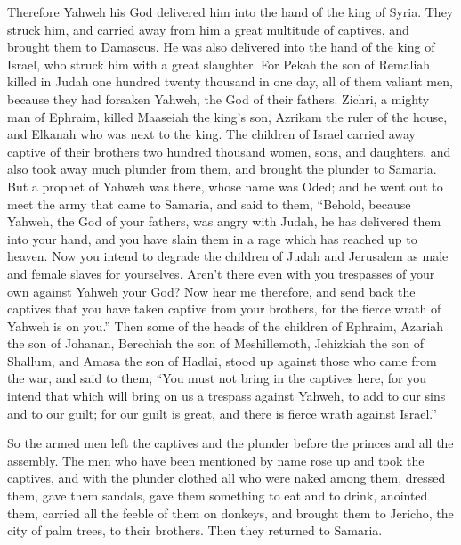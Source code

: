  Therefore Yahweh his God delivered him into the hand of
the king of Syria. They struck him, and carried away from him a great
multitude of captives, and brought them to Damascus. He was also
delivered into the hand of the king of Israel, who struck him with a
great slaughter.  For Pekah the son of Remaliah killed in
Judah one hundred twenty thousand in one day, all of them valiant men,
because they had forsaken Yahweh, the God of their fathers.
 Zichri, a mighty man of Ephraim, killed Maaseiah the
king's son, Azrikam the ruler of the house, and Elkanah who was next to
the king.  The children of Israel carried away captive of
their brothers two hundred thousand women, sons, and daughters, and also
took away much plunder from them, and brought the plunder to Samaria.
 But a prophet of Yahweh was there, whose name was Oded;
and he went out to meet the army that came to Samaria, and said to them,
``Behold, because Yahweh, the God of your fathers, was angry with Judah,
he has delivered them into your hand, and you have slain them in a rage
which has reached up to heaven.  Now you intend to
degrade the children of Judah and Jerusalem as male and female slaves
for yourselves. Aren't there even with you trespasses of your own
against Yahweh your God?  Now hear me therefore, and send
back the captives that you have taken captive from your brothers, for
the fierce wrath of Yahweh is on you.''  Then some of the
heads of the children of Ephraim, Azariah the son of Johanan, Berechiah
the son of Meshillemoth, Jehizkiah the son of Shallum, and Amasa the son
of Hadlai, stood up against those who came from the war, 
and said to them, ``You must not bring in the captives here, for you
intend that which will bring on us a trespass against Yahweh, to add to
our sins and to our guilt; for our guilt is great, and there is fierce
wrath against Israel.''

 So the armed men left the captives and the plunder
before the princes and all the assembly.  The men who
have been mentioned by name rose up and took the captives, and with the
plunder clothed all who were naked among them, dressed them, gave them
sandals, gave them something to eat and to drink, anointed them, carried
all the feeble of them on donkeys, and brought them to Jericho, the city
of palm trees, to their brothers. Then they returned to Samaria.

